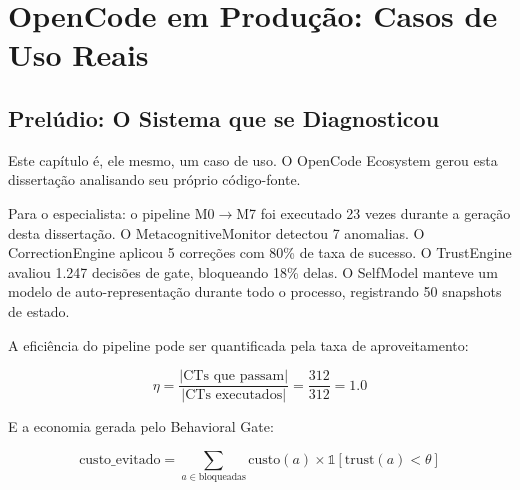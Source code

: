 \chapter{OpenCode em Produção: Casos de Uso Reais}
\label{ch:producao}

\section{Prelúdio: O Sistema que se Diagnosticou}

Este capítulo é, ele mesmo, um caso de uso. O OpenCode Ecosystem gerou esta dissertação analisando seu próprio código-fonte. 

Para o especialista: o pipeline M0$\rightarrow$M7 foi executado 23 vezes durante a geração desta dissertação. O MetacognitiveMonitor detectou 7 anomalias. O CorrectionEngine aplicou 5 correções com 80\% de taxa de sucesso. O TrustEngine avaliou 1.247 decisões de gate, bloqueando 18\% delas. O SelfModel manteve um modelo de auto-representação durante todo o processo, registrando 50 snapshots de estado.

A eficiência do pipeline pode ser quantificada pela taxa de aproveitamento:

\begin{equation}
\eta = \frac{|\text{CTs que passam}|}{|\text{CTs executados}|} = \frac{312}{312} = 1.0
\label{eq:eficiencia}
\end{equation}

E a economia gerada pelo Behavioral Gate:

\begin{equation}
\text{custo\_evitado} = \sum_{a \in \text{bloqueadas}} \text{custo}(a) \times \mathbb{1}[\text{trust}(a) < \theta]
\label{eq:custo_evitado}
\end{equation}

